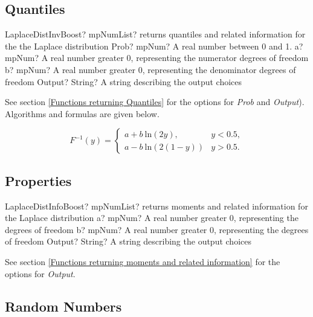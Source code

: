 \subsection{Quantiles}
\begin{mpFunctionsExtract}
	\mpFunctionFour
	{LaplaceDistInvBoost? mpNumList? returns quantiles and related information for the the Laplace distribution}
	{Prob? mpNum? A real number between 0 and 1.}
	{a? mpNum? A real number greater 0, representing the numerator  degrees of freedom}
	{b? mpNum? A real number greater 0, representing the denominator degrees of freedom}
	{Output? String? A string describing the output choices}
\end{mpFunctionsExtract}

See section \ref{Functions returning Quantiles} for the options for  {\itshape\sffamily Prob} and {\itshape\sffamily Output}). Algorithms and formulas are given below.

\vspace{0.3cm}
\begin{equation}
	F^{-1}(y)=\begin{cases}
		a+b \: \text{ln}(2y), & y<0.5,\\
		a-b \: \text{ln}(2(1-y))  & y>0.5.
	\end{cases}
\end{equation}



\subsection{Properties}
\label{LaplaceDistributionProperties}

\begin{mpFunctionsExtract}
	\mpFunctionThree
	{LaplaceDistInfoBoost? mpNumList? returns moments and related information for the Laplace distribution}
	{a? mpNum? A real number greater 0, representing the degrees of freedom}
	{b? mpNum? A real number greater 0, representing the degrees of freedom}
	{Output? String? A string describing the output choices}
\end{mpFunctionsExtract}

\vspace{0.3cm}

See section \ref{Functions returning moments and related information} for the options for {\itshape\sffamily Output}. 



\subsection{Random Numbers}

